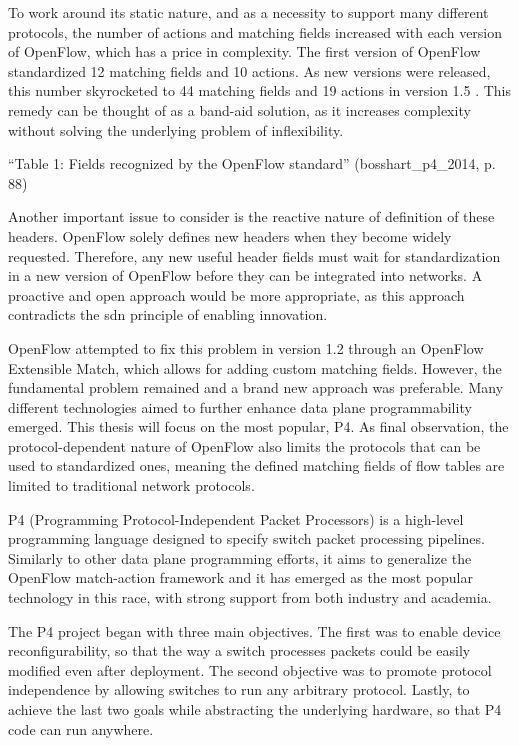 To work around its static nature, and as a necessity to support many different protocols, the number of actions and matching fields increased with each version of OpenFlow, which has a price in complexity. The first version of OpenFlow standardized 12 matching fields and 10 actions. As new versions were released, this number skyrocketed to 44 matching fields and 19 actions in version 1.5 \cite{li_protocol_2017}\cite{bosshart_p4_2014}. This remedy can be thought of as a band-aid solution, as it increases complexity without solving the underlying problem of inflexibility.

“Table 1: Fields recognized by the OpenFlow standard” (bosshart_p4_2014, p. 88)

Another important issue to consider is the reactive nature of definition of these headers. OpenFlow solely defines new headers when they become widely requested. Therefore, any new useful header fields must wait for standardization in a new version of OpenFlow before they can be integrated into networks. A proactive and open approach would be more appropriate, as this approach contradicts the \gls{sdn} principle of enabling innovation. \cite{li_protocol_2017}

OpenFlow attempted to fix this problem in version 1.2 through an OpenFlow Extensible Match, which allows for adding custom matching fields\cite{kreutz_software-defined_2015}. However, the fundamental problem remained and a brand new approach was preferable. Many different technologies aimed to further enhance data plane programmability emerged. This thesis will focus on the most popular, P4.
As final observation, the protocol-dependent nature of OpenFlow also limits the protocols that can be used to standardized ones, meaning the defined matching fields of flow tables are limited to traditional network protocols. 

P4 (Programming Protocol-Independent Packet Processors) is a high-level programming language designed to specify switch packet processing pipelines. Similarly to other data plane programming efforts, it aims to generalize the OpenFlow match-action framework and it has emerged as the most popular technology in this race, with strong support from both industry and academia\cite{hauser_survey_2021}.

The P4 project began with three main objectives\cite{bosshart_p4_2014}. The first was to enable device reconfigurability, so that the way a switch processes packets could be easily modified even after deployment. The second objective was to promote protocol independence by allowing switches to run any arbitrary protocol. Lastly, to achieve the last two goals while abstracting the underlying hardware, so that P4 code can run anywhere. 

